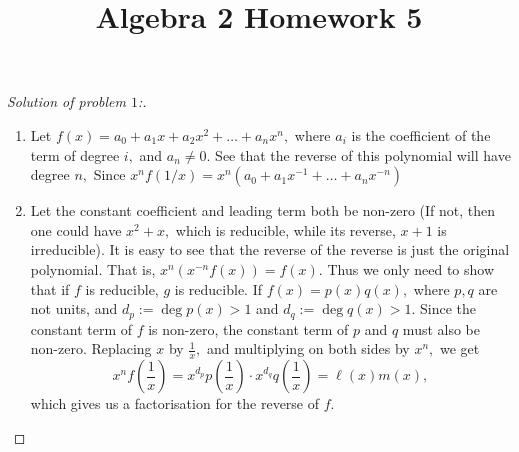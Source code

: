 \documentclass[letterpaper,11pt,twoside]{article}
\title{Algebra 2 Homework 5}
\theoremstyle{proposition}
\theoremstyle{definition}
\theoremstyle{theorem}
\theoremstyle{definition}
\theoremstyle{definition}
\theoremstyle{definition}
\theoremstyle{lemma}
\theoremstyle{definition}
\theoremstyle{definition}
\theoremstyle{corollary}
\theoremstyle{definition}
\theoremstyle{definition}
\theoremstyle{definition}
\begin{document}
	\maketitle
	\begin{proof}[Solution of problem $1$:]
		\begin{enumerate}
			\item Let $f(x)= a_0 + a_1x + a_2x^2 + \dots + a_n x^n,$ where $a_i$ is the coefficient of the term of degree $i,$ and $a_n \neq 0.$ See that 
			the reverse of this polynomial will have degree $n,$ Since $x^nf(1/x)= x^n\left(a_0 + a_1x^{-1} + \dots + a_n x^{-n} \right)$
			\item Let the constant coefficient and leading term both be non-zero (If not, then one could have $x^2+x,$ which is reducible, while its 
			reverse, $x+1$ is irreducible). It is easy to see that the reverse of the reverse is just the original polynomial. That is, $x^n 
			(x^{-n}f(x))=f(x).$ Thus we only need to show that if $f$ is reducible, $g$ is reducible. If $f(x)=p(x)q(x),$ where $p,q$ are not units, and 
			$d_p := \deg p(x)>1$ and $d_q := \deg q(x)>1.$ Since the constant term of $f$ is non-zero, the constant term of $p$ and $q$ must also be 
			non-zero. Replacing $x$ by $\frac{1}{x},$ and multiplying on both sides by $x^n,$ we get 
			$$x^nf\left(\frac{1}{x}\right)= x^{d_p}p\left(\frac{1}{x}\right) \cdot x^{d_q}q\left(\frac{1}{x}\right) = \ell (x) m(x),$$ which gives us a 
			factorisation for the reverse of $f.$  
		\end{enumerate}
	\end{proof}
\end{document}
